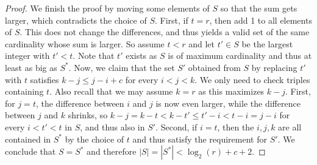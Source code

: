 \documentclass[10pt,a4paper]{amsart}
\begin{document}
\begin{proof}
    We finish the proof by moving some elements of $ S $ so that the sum gets larger, which contradicts the choice of $ S $.
    First, if $ t = r $, then add 1 to all elements of $ S $.
    This does not change the differences, and thus yields a valid set of the same cardinality whose sum is larger.
    So assume $ t < r $ and let $ t' \in S $ be the largest integer with $ t' < t $.
    Note that $ t' $ exists as $ S $ is of maximum cardinality and thus at least as big as $ S^* $.
    Now, we claim that the set $ S' $ obtained from $ S $ by replacing $ t' $ with  $t$ satisfies $ k - j \leq j - i + c $ for every $ i < j < k $.
    We only need to check triples containing $ t $.
    Also recall that we may assume $ k = r $ as this maximizes $ k - j $.
    First, for $ j = t $, the difference between $ i $ and $ j $ is now even larger, while the difference between $ j $ and $ k $ shrinks, so $ k - j = k - t < k - t' \leq t' - i < t - i = j - i $ for every $ i < t' < t$ in $ S $, and thus also in $ S' $.
    Second, if $ i = t $, then the $ i, j, k $ are all contained in $ S^* $ by the choice of $ t $ and thus satisfy the requirement for $ S' $.
    We conclude that $ S = S^* $ and therefore $ |S| = |S^*| < \log_2(r) + c + 2 $.
\end{proof}
\end{document}
